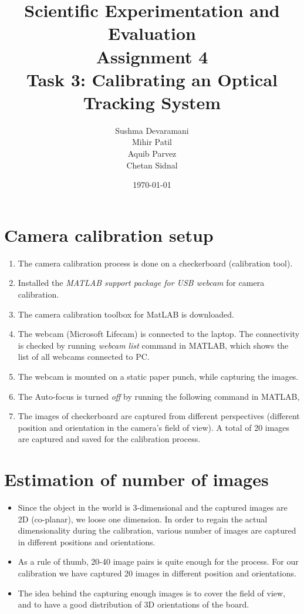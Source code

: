 \documentclass[11pt,a4paper,titlepage]{article}
\title{\blueb Scientific Experimentation and Evaluation \\
\blueb Assignment 4 \\ Task 3: Calibrating an Optical Tracking System}
\author{Sushma Devaramani \\ Mihir Patil \\ Aquib Parvez \\ Chetan Sidnal }
\date{\today}
\begin{document}
\maketitle
\tableofcontents
\newpage
\section{Camera calibration setup}
\begin{enumerate}
\item The camera calibration process is done on a checkerboard (calibration tool).
\item Installed the \textit{MATLAB support package for USB webcam} for camera calibration.
\item The camera calibration toolbox for MatLAB is downloaded.
\item The webcam (Microsoft Lifecam) is connected to the laptop. The connectivity is checked by running \textit{webcam list} command in MATLAB, which shows the list of all webcams connected to PC.
\item The webcam is mounted on a static paper punch, while capturing the images.
\item The Auto-focus is turned \textit{off} by running the following command in MATLAB, \\ 
\item The images of checkerboard are captured from different perspectives (different position and orientation in the camera's field of view). A total of 20 images are captured and saved for the calibration process.
\end{enumerate}

\section{Estimation of number of images}
\begin{itemize}
\item Since the object in the world is 3-dimensional and the captured images are 2D (co-planar), we loose one dimension. In order to regain the actual dimensionality during the calibration, various number of images are captured in different positions and orientations. 
\item As a rule of thumb, 20-40 image pairs is quite enough for the process. For our calibration we have captured 20 images in different position and orientations. 
\item The idea behind the capturing enough images is to cover the field of view, and to have a good distribution of 3D orientations of the board. 
\end{itemize}
\end{document}

